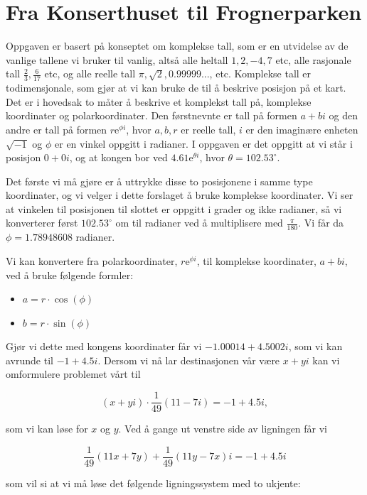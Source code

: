 \section*{Fra Konserthuset til Frognerparken}

Oppgaven er basert på konseptet om komplekse tall, som er en utvidelse av de vanlige tallene vi bruker til vanlig, altså alle heltall $1, 2, -4, 7$ etc, alle rasjonale tall $\frac{2}{3}, \frac{6}{17}$ etc, og alle reelle tall $\pi, \sqrt{2}, 0.99999...$, etc. Komplekse tall er todimensjonale, som gjør at vi kan bruke de til å beskrive posisjon på et kart. Det er i hovedsak to måter å beskrive et komplekst tall på, komplekse koordinater og polarkoordinater. Den førstnevnte er tall på formen $a+bi$ og den andre er tall på formen $r\mathrm{e}^{\phi i}$, hvor $a,b,r$ er reelle tall, $i$  er den imaginære enheten $\sqrt{-1}$ og $\phi$ er en vinkel oppgitt i radianer. I oppgaven er det oppgitt at vi står i posisjon $0+0i$, og at kongen bor ved $4.61\mathrm{e}^{\theta i}$, hvor $\theta=102.53^\circ$. 

Det første vi må gjøre er å uttrykke disse to posisjonene i samme type koordinater, og vi velger i dette forslaget å bruke komplekse koordinater. Vi ser at vinkelen til posisjonen til slottet er oppgitt i grader og ikke radianer, så vi konverterer først $102.53^\circ$ om til radianer ved å multiplisere med $\frac{\pi}{180}$. Vi får da $\phi = 1.78948608$ radianer. 

Vi kan konvertere fra polarkoordinater, $r\mathrm{e}^{\phi i}$, til komplekse koordinater, $a+bi$, ved å bruke følgende formler: 

\begin{itemize}
    \item $a = r\cdot \cos(\phi)$
    \item $b=r\cdot \sin(\phi)$
\end{itemize}

Gjør vi dette med kongens koordinater får vi $-1.00014 + 4.5002 i$, som vi kan avrunde til $-1+4.5i$. Dersom vi nå lar destinasjonen vår være $x+yi$ kan vi omformulere problemet vårt til 

$$
(x+yi)\cdot \frac{1}{49}(11-7i) = -1+4.5i,
$$

som vi kan løse for $x$ og $y$. Ved å gange ut venstre side av ligningen får vi 

$$
\frac{1}{49}(11x+7y)+\frac{1}{49}(11y-7x)i = -1+4.5i
$$

som vil si at vi må løse det følgende ligningssystem med to ukjente: 

